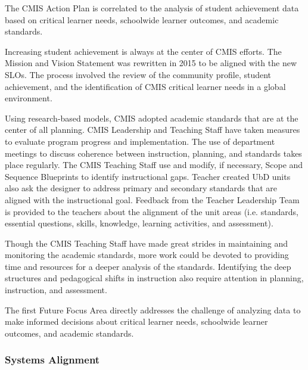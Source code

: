 
\begin{findings}
The CMIS Action Plan is correlated to the analysis of student achievement data based on critical learner needs, schoolwide learner outcomes, and academic standards.

Increasing student achievement is always at the center of CMIS efforts. The Mission and Vision Statement was rewritten in 2015 to be aligned with the new SLOs. The process involved the review of the community profile, student achievement, and the identification of CMIS critical learner needs in a global environment.

Using research-based models, CMIS adopted academic standards that are at the center of all planning. CMIS Leadership and Teaching Staff have taken measures to evaluate program progress and implementation. The use of department meetings to discuss coherence between instruction, planning, and standards takes place regularly. The CMIS Teaching Staff use and modify, if necessary, Scope and Sequence Blueprints to identify instructional gaps. Teacher created UbD units also ask the designer to address primary and secondary standards that are aligned with the instructional goal. Feedback from the Teacher Leadership Team is provided to the teachers about the alignment of the unit areas (i.e. standards, essential questions, skills, knowledge, learning activities, and assessment). 


Though the CMIS Teaching Staff have made great strides in maintaining and monitoring the academic standards, more work could be devoted to providing time and resources for a deeper analysis of the standards. Identifying the deep structures and pedagogical shifts in instruction also require attention in planning, instruction, and assessment.  

The first Future Focus Area directly addresses the challenge of analyzing data to make informed decisions about critical learner needs, schoolwide learner outcomes, and academic standards. 
\end{findings}

\subsubsection{Systems Alignment}

